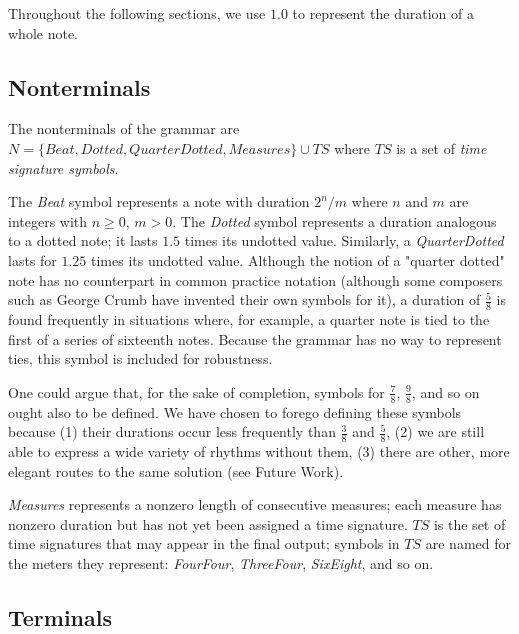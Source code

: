 \documentclass{article}
\begin{document}
Throughout the following sections, we use $1.0$ to represent the duration of a whole note.

\subsection{Nonterminals}

The nonterminals of the grammar are $N=\{Beat,\allowbreak Dotted,\allowbreak QuarterDotted,\allowbreak Measures \} \cup TS$ where $TS$ is a set of \emph{time signature symbols}. 


The \emph{Beat} symbol represents a note with duration $2^n/m$ where $n$ and $m$ are integers with $n \geq 0$, $m > 0$. The \emph{Dotted} symbol represents a duration analogous to a dotted note; it lasts $1.5$ times its undotted value. Similarly, a \emph{QuarterDotted} lasts for $1.25$ times its undotted value. Although the notion of a "quarter dotted" note has no counterpart in common practice notation (although some composers such as George Crumb have invented their own symbols for it), a duration of $\frac{5}{8}$ is found frequently in situations where, for example, a quarter note is tied to the first of a series of sixteenth notes. Because the grammar has no way to represent ties, this symbol is included for robustness.

One could argue that, for the sake of completion, symbols for $\frac{7}{8}$, $\frac{9}{8}$, and so on ought also to be defined. We have chosen to forego defining these symbols because (1) their durations occur less frequently than $\frac{3}{8}$ and $\frac{5}{8}$, (2) we are still able to express a wide variety of rhythms without them, (3) there are other, more elegant routes to the same solution (see Future Work).


\emph{Measures} represents a nonzero length of consecutive measures; each measure has nonzero duration but has not yet been assigned a time signature. $TS$ is the set of time signatures that may appear in the final output; symbols in $TS$ are named for the meters they represent: \emph{FourFour}, \emph{ThreeFour}, \emph{SixEight}, and so on.

\subsection{Terminals}
\end{document}
